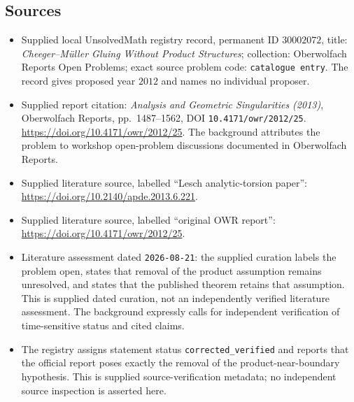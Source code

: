 \documentclass[11pt]{article}
\begin{document}
\subsection{Sources}
\begin{itemize}
\item Supplied local UnsolvedMath registry record, permanent ID \(30002072\), title: \emph{Cheeger--Müller Gluing Without Product Structures}; collection: Oberwolfach Reports Open Problems; exact source problem code: \texttt{catalogue entry}. The record gives proposed year \(2012\) and names no individual proposer.
\item Supplied report citation: \emph{Analysis and Geometric Singularities (2013)}, Oberwolfach Reports, pp.~1487--1562, DOI \texttt{10.4171/owr/2012/25}. \url{https://doi.org/10.4171/owr/2012/25}. The background attributes the problem to workshop open-problem discussions documented in Oberwolfach Reports.
\item Supplied literature source, labelled ``Lesch analytic-torsion paper'': \url{https://doi.org/10.2140/apde.2013.6.221}.
\item Supplied literature source, labelled ``original OWR report'': \url{https://doi.org/10.4171/owr/2012/25}.
\item Literature assessment dated \texttt{2026-08-21}: the supplied curation labels the problem open, states that removal of the product assumption remains unresolved, and states that the published theorem retains that assumption. This is supplied dated curation, not an independently verified literature assessment. The background expressly calls for independent verification of time-sensitive status and cited claims.
\item The registry assigns statement status \texttt{corrected\_verified} and reports that the official report poses exactly the removal of the product-near-boundary hypothesis. This is supplied source-verification metadata; no independent source inspection is asserted here.
\end{itemize}
\end{document}
